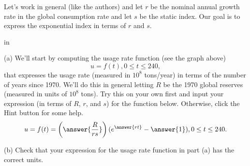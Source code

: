 \documentclass{ximera}
\newcommand{\pskip}{\vskip 0.1 in}
\begin{document}
\begin{question}   \label{Q34fratr5}
Let's work in general (like the authors) and let $r$ be the nominal annual growth rate in the global consumption rate and let $s$ be the static index. Our goal is to express  the exponential index in terms of $r$ and $s$.  

\pskip 

(a) We'll start by computing the usage rate function (see the graph above)
\[
     u = f(t) , 0\leq t \leq 240,
\]
that expresses the usage rate (measured in $10^8$ tons/year) in terms of the number of years since 1970. We'll do this in general letting $R$ be the 1970 global reserves (measured in units of $10^8$ tons). Try this on your own first and input your expression (in terms of $R$, $r$, and $s$) for the function below. Otherwise, click the Hint button for some help.
\[
   u = f(t) = \left( \answer{\frac{R}{rs}} \right) (e^{\answer{rt}} - \answer{1}) , 0\leq t \leq 240 .
\]

(b) Check that your expression for the usage rate function in part (a) has the correct units.



 
\begin{onlineOnly}
    \begin{center}
\end{center}
\end{onlineOnly}




\end{question}
\end{document}
